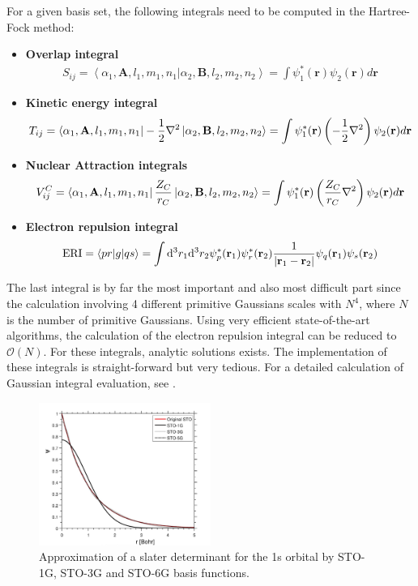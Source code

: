 \documentclass[twoside,        %
			   12pt,			%
               BCOR10mm,       %
               ngerman,english  %
               ]{scrartcl}
\begin{document}
For a given basis set, the following integrals need to be computed in the Hartree-Fock method:
\begin{itemize}
\item \textbf{Overlap integral}
\begin{align*}
S_{ij} = \left<\alpha_1, \mathbf{A}, l_1, m_1, n_1 |\alpha_2, \mathbf{B}, l_2, m_2, n_2 \right> = \int \psi_1^*(\mathbf{r})
\psi_2(\mathbf{r})d\mathbf{r}
\end{align*}
\item \textbf{Kinetic energy integral}
\begin{align*}
T_{ij} = \bra{\alpha_1, \mathbf{A}, l_1, m_1, n_1}-\frac{1}{2}\nabla^2\ket{\alpha_2, \mathbf{B}, l_2, m_2, n_2} = \int \psi_1^*(\mathbf{r})\left( -\frac{1}{2}\nabla^2\right)
\psi_2(\mathbf{r})d\mathbf{r}
\end{align*}
\item \textbf{Nuclear Attraction integrals}
\begin{align*}
V_{ij}^C = \bra{\alpha_1, \mathbf{A}, l_1, m_1, n_1}\frac{Z_C}{r_C}\ket{\alpha_2, \mathbf{B}, l_2, m_2, n_2} = \int \psi_1^*(\mathbf{r})\left(\frac{Z_C}{r_C}\nabla^2\right)
\psi_2(\mathbf{r})d\mathbf{r}
\end{align*}
\item \textbf{Electron repulsion integral}
\begin{align*}
\text{ERI} = \left<pr|g|qs\right> = \int \mathrm{d}^3 r_1 \mathrm{d}^3 r_2 \psi_p^*(\mathbf{r}_1) \psi_r^*(\mathbf{r}_2) \frac{1}{\left| \mathbf{r}_1 -\mathbf{r}_2 \right|} \psi_q(\mathbf{r}_1) \psi_s(\mathbf{r}_2)
\end{align*}
\end{itemize} The last integral is by far the most important and also most difficult part since the calculation involving 4 different primitive Gaussians scales with $N^4$, where $N$ is the number of primitive Gaussians. Using very efficient state-of-the-art algorithms, the calculation of the electron repulsion integral can be reduced to $\mathcal{O}(N)$.
For these integrals, analytic solutions exists. The implementation of these integrals is straight-forward but very tedious. For a detailed calculation of Gaussian integral evaluation, see \cite{fermann1997fundamentals, petersson2009detailed, gill1989efficient, huzinaga1985basis, raffenetti1973general}. 


\begin{figure}
\centering
\includegraphics[width=0.5\textwidth]{figures/1228px-Gauss_sto4.png}
\caption{Approximation of a slater determinant for the 1s orbital by STO-1G, STO-3G and STO-6G basis functions. \cite{pict}}
\label{fig:STO_GTO}
\end{figure}
\end{document}
